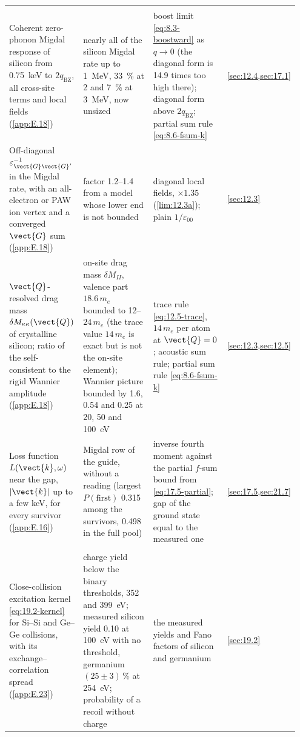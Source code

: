{\begin{longtable}{@{}>{\raggedright\arraybackslash}p{0.25\linewidth}>{\raggedright\arraybackslash}p{0.305\linewidth}>{\raggedright\arraybackslash}p{0.305\linewidth}>{\raggedright\arraybackslash}p{0.09\linewidth}@{}}
  \midrule
  \multicolumn{4}{@{}l}{\emph{Migdal rate and ranking}} \\
  Coherent zero-phonon Migdal response of silicon from \SI{0.75}{keV} to $2q_{\mathrm{BZ}}$, all cross-site terms and local fields (\cref{app:E.18}) & nearly all of the silicon Migdal rate up to \SI{1}{MeV}, \SI{33}{\percent} at 2 and \SI{7}{\percent} at \SI{3}{MeV}, now unsized & boost limit \cref{eq:8.3-boostward} as $q \to 0$ (the diagonal form is 14.9 times too high there); diagonal form above $2q_{\mathrm{BZ}}$; partial sum rule \cref{eq:8.6-fsum-k} & \cref{sec:12.4,sec:17.1} \\
  Off-diagonal $\varepsilon^{-1}_{\vect{G}\vect{G}'}$ in the Migdal rate, with an all-electron or PAW ion vertex and a converged $\vect{G}$ sum (\cref{app:E.18}) & factor 1.2--1.4 from a model whose lower end is not bounded & diagonal local fields, $\times1.35$ (\cref{lim:12.3a}); plain $1/\varepsilon_{00}$ & \cref{sec:12.3} \\
  $\vect{Q}$-resolved drag mass $\delta M_{\kappa\kappa}(\vect{Q})$ of crystalline silicon; ratio of the self-consistent to the rigid Wannier amplitude (\cref{app:E.18}) & on-site drag mass $\delta M_{II}$, valence part $18.6\,m_e$ bounded to 12--$24\,m_e$ (the trace value $14\,m_e$ is exact but is not the on-site element); Wannier picture bounded by 1.6, 0.54 and 0.25 at 20, 50 and \SI{100}{eV} & trace rule \cref{eq:12.5-trace}, $14\,m_e$ per atom at $\vect{Q} = 0$; acoustic sum rule; partial sum rule \cref{eq:8.6-fsum-k} & \cref{sec:12.3,sec:12.5} \\
  Loss function $L(\vect{k},\omega)$ near the gap, $|\vect{k}|$ up to a few keV, for every survivor (\cref{app:E.16}) & Migdal row of the guide, without a reading (largest $P(\mathrm{first})$ 0.315 among the survivors, 0.498 in the full pool) & inverse fourth moment against the partial $f$-sum bound from \cref{eq:17.5-partial}; gap of the ground state equal to the measured one & \cref{sec:17.5,sec:21.7} \\
  \midrule
  \multicolumn{4}{@{}l}{\emph{Charge of a nuclear recoil and the cascade}} \\
  Close-collision excitation kernel \cref{eq:19.2-kernel} for Si--Si and Ge--Ge collisions, with its exchange--correlation spread (\cref{app:E.23}) & charge yield below the binary thresholds, 352 and \SI{399}{eV}; measured silicon yield 0.10 at \SI{100}{eV} with no threshold, germanium $(25 \pm 3)\,\%$ at \SI{254}{eV}; probability of a recoil without charge & the measured yields and Fano factors of silicon and germanium & \cref{sec:19.2} \\

\end{longtable}}

